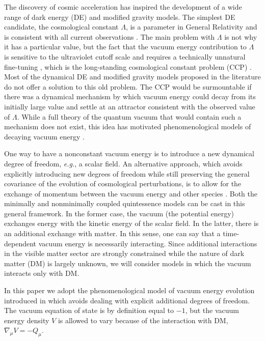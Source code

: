 \documentclass[prd,twocolumn,preprintnumbers,amsmath,amssymb,nofootinbib,english,showpacs]{revtex4-1}
\def\eg{{\frenchspacing\it e.g.}}
\begin{document}
The discovery of cosmic acceleration \cite{Riess:1998May, Perlmuter:1999Dec} has inspired the development of a wide range of dark energy (DE) and modified gravity models. The simplest DE candidate, the cosmological constant $\Lambda$, is a parameter in General Relativity and is consistent with all current observations \cite{Planck:2015Cos}. The main problem with $\Lambda$ is not why it has a particular value, but the fact that the vacuum energy contribution to $\Lambda$ is sensitive to the ultraviolet cutoff scale and requires a technically unnatural fine-tuning \cite{Burgess:2013ara}, which is the long-standing cosmological constant problem (CCP) \cite{Weinberg:1988cp}. Most of the dynamical DE and modified gravity models proposed in the literature do not offer a solution to this old problem. The CCP would be surmountable if there was a dynamical mechanism by which vacuum energy could decay from its initially large value and settle at an attractor consistent with the observed value of $\Lambda$. While a full theory of the quantum vacuum that would contain such a mechanism does not exist, this idea has motivated phenomenological models of decaying vacuum energy \cite{Bertolami:1986bg,Freese:1986dd,Chen:1990jw,Carvalho:1991ut,Berman:1991zz,Shapiro:2000dz,Sola:2011qr}.

One way to have a nonconstant vacuum energy is to introduce a new dynamical degree of freedom, \eg, a scalar field. An alternative approach, which avoids explicitly introducing new degrees of freedom while still preserving the general covariance of the evolution of cosmological perturbations, is to allow for the exchange of momentum between the vacuum energy and other species \cite{Wands:2012Mar}. Both the minimally \cite{Ratra:1998apj, Ratra:1998prd, Caldwell:1997ii} and nonminimally \cite{Wetterich:1994bg, Holden:1999hm, Amendola:1999er} coupled quintessence models can be cast in this general framework. In the former case, the vacuum (the potential energy) exchanges energy with the kinetic energy of the scalar field. In the latter, there is an additional exchange with matter. In this sense, one can say that a time-dependent vacuum energy is necessarily interacting. Since additional interactions in the visible matter sector are strongly constrained while the nature of dark matter (DM) is largely unknown, we will consider models in which the vacuum interacts only with DM.

In this paper we adopt the phenomenological model of vacuum energy evolution introduced in \cite{Wands:2012Mar} which avoids dealing with explicit additional degrees of freedom. The vacuum equation of state is by definition equal to  $-1$, but the vacuum energy density $V$ is allowed to vary because of the interaction with DM, $\nabla_{\mu}V=-Q_{\mu}$.
\end{document}
